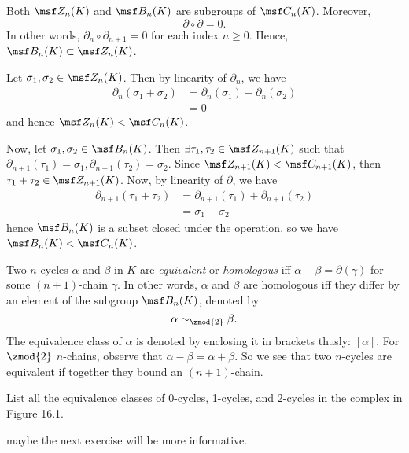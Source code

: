 \begin{problem}[16.4]
  Both $\msf Z_n(K)$ and $\msf B_n(K)$ are subgroups of $\msf C_n(K)$. Moreover,
  \[
    \partial \circ \partial = 0.
  \]
  In other words, $\partial_n \circ \partial_{n+1} = 0$ for each index $n \geq
  0$. Hence, $\msf B_n(K) \subset \msf Z_n(K)$.
\end{problem}
\begin{solution}
  Let $\sigma_1, \sigma_2 \in \msf Z_n(K)$. Then by linearity of $\partial_n$,
  we have
  \begin{align*}
    \partial_n(\sigma_1 + \sigma_2)
    &= \partial_n(\sigma_1) + \partial_n(\sigma_2) \\
    &= 0
  \end{align*}
  and hence $\msf Z_n(K) < \msf C_n(K)$.

  Now, let $\sigma_1, \sigma_2 \in \msf B_n(K)$. Then $\exists \tau_1, \tau_2
  \in \msf Z_{n+1}(K)$ such that $\partial_{n+1}(\tau_1) = \sigma_1,
  \partial_{n+1}(\tau_2) = \sigma_{2}$. Since $\msf Z_{n+1}(K) < \msf
  C_{n+1}(K)$, then $\tau_1 + \tau_2 \in \msf Z_{n+1}(K)$. Now, by linearity of
  $\partial$, we have
  \begin{align*}
    \partial_{n+1}(\tau_1 + \tau_2)
    &= \partial_{n+1}(\tau_1) + \partial_{n+1}(\tau_2) \\
    &= \sigma_1 + \sigma_2
  \end{align*}
  hence $\msf B_n(K)$ is a subset closed under the operation, so we have $\msf
  B_n(K) < \msf C_n(K)$.
\end{solution}
\begin{definition}
  Two $n$-cycles $\alpha$ and $\beta$ in $K$ are \emph{equivalent} or
  \emph{homologous} iff $\alpha-\beta = \partial(\gamma)$ for some $(n+1)$-chain
  $\gamma$. In other words, $\alpha$ and $\beta$ are homologous iff they differ
  by an element of the subgroup $\msf B_n(K)$, denoted by
  \[
    \alpha \sim_{\zmod{2}} \beta.
  \]
  The equivalence class of $\alpha$ is denoted by enclosing it in brackets
  thusly: $[\alpha]$. For $\zmod{2}$ $n$-chains, observe that $\alpha - \beta =
  \alpha + \beta$. So we see that two $n$-cycles are equivalent if together they
  bound an $(n+1)$-chain.
\end{definition}
\begin{problem}[16.5]
  List all the equivalence classes of $0$-cycles, 1-cycles, and 2-cycles in the
  complex in Figure 16.1.
\end{problem}
\begin{solution}
  {\color{red} maybe the next exercise will be more informative.}
\end{solution}
